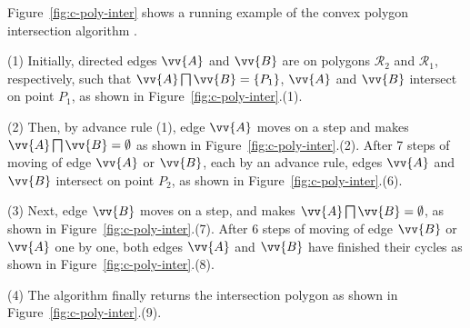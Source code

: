 \begin{example}
Figure~\ref{fig:c-poly-inter} shows a running example of the convex polygon intersection algorithm \cpia.

\sstab(1) Initially, directed edges $\vv{A}$ and $\vv{B}$ are on polygons $\mathcal{R}_2$ and $\mathcal{R}_1$, respectively, such that $\vv{A} \bigsqcap \vv{B} = \{P_1\}$, \ie $\vv{A}$ and $\vv{B}$ intersect on point $P_1$, as shown in Figure~\ref{fig:c-poly-inter}.(1).

\sstab(2) Then, by advance rule (1), edge $\vv{A}$ moves on a step and makes $\vv{A} \bigsqcap \vv{B} = \emptyset$ as shown in Figure~\ref{fig:c-poly-inter}.(2).
After 7 steps of moving of edge $\vv{A}$ or $\vv{B}$, each by an advance rule, edges $\vv{A}$ and $\vv{B}$ intersect on point $P_2$, as shown in Figure~\ref{fig:c-poly-inter}.(6).

\sstab(3) Next, edge $\vv{B}$ moves on a step, and makes $\vv{A} \bigsqcap \vv{B} = \emptyset$, as shown in Figure~\ref{fig:c-poly-inter}.(7).
After 6 steps of moving of edge $\vv{B}$ or $\vv{A}$ one by one, both edges $\vv{A}$ and $\vv{B}$ have finished their cycles as shown in Figure~\ref{fig:c-poly-inter}.(8).

\sstab(4) The algorithm finally returns the intersection polygon as shown in Figure~\ref{fig:c-poly-inter}.(9).
\end{example}









